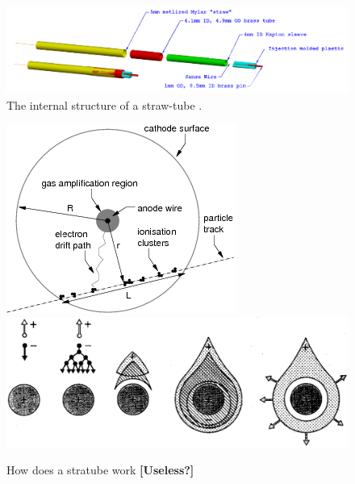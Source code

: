 \documentclass[12pt,a4paper,openright, oneside, titlepage]{book} %
\begin{document}
\begin{figure}[h!]
\centering
\includegraphics[scale=0.4]{straw}
\caption{The internal structure of a straw-tube \cite{MTDR}.}
\label{_straw}
\end{figure}

\begin{figure}[h!]
\centering
\includegraphics[scale=0.5]{straw_avalanche}
\includegraphics[scale=0.4]{straw_avalanche_2}
\caption{How does a stratube work \cite{MultiwireDrift} \textbf{[Useless?]}}
\label{_straw_avalanche}
\end{figure}
\end{document}
